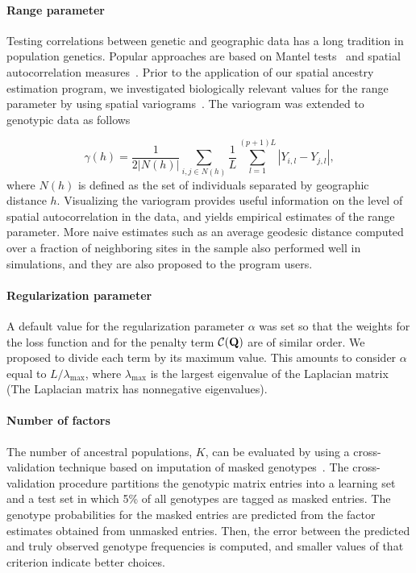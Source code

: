 \paragraph{Range parameter} Testing correlations between genetic and geographic data
has a long tradition in population genetics. Popular approaches are based on
Mantel tests~\citep{mantel1967} and spatial autocorrelation
measures~\citep{hardy1999, epperson1996}. Prior to the application of our spatial ancestry
estimation program, we investigated biologically relevant values for the range
parameter by using spatial variograms~\citep{Cressie1993}. The variogram was
extended to genotypic data as follows


\begin{equation}
\gamma(h) = \frac{1}{2 |N(h)|} \sum_{i,j \in N(h)} \frac{1}{L} \sum_{l = 1}^{(p+1)L} |Y_{i,l} - Y_{j,l}|,
\label{eq:gamma}
\end{equation}
where $N(h)$ is defined as the set of individuals separated by geographic
distance $h$. Visualizing the variogram provides useful information on the level
of spatial autocorrelation in the data, and yields empirical estimates of the
range parameter. More naive estimates such as an average geodesic distance
computed over a fraction of neighboring sites in the sample also performed well
in simulations, and they are also proposed to the program users.

\paragraph{Regularization parameter} A default value for the regularization
parameter $\alpha$ was set so that the weights for the loss function and for
the penalty term ${\cal C}({\bf Q})$ are of similar order. We proposed to divide
each term by its maximum value. This amounts to consider $\alpha$ equal to $L /
\lambda_\max$, where $\lambda_\max$ is the largest eigenvalue of the Laplacian
matrix (The Laplacian matrix has nonnegative eigenvalues).

\paragraph{Number of factors} The number of ancestral populations, $K$, can be
evaluated by using a cross-validation technique based on imputation of masked
genotypes~\citep{wold1978,eastment1982, Alexander2011, Frichot2014}. The
cross-validation procedure partitions the genotypic matrix entries into a
learning set and a test set in which 5\% of all genotypes are tagged as masked
entries. The genotype probabilities for the masked entries are predicted from
the factor estimates obtained from unmasked entries. Then, the error
between the predicted and truly observed genotype frequencies is computed, and
smaller values of that criterion indicate better choices.

